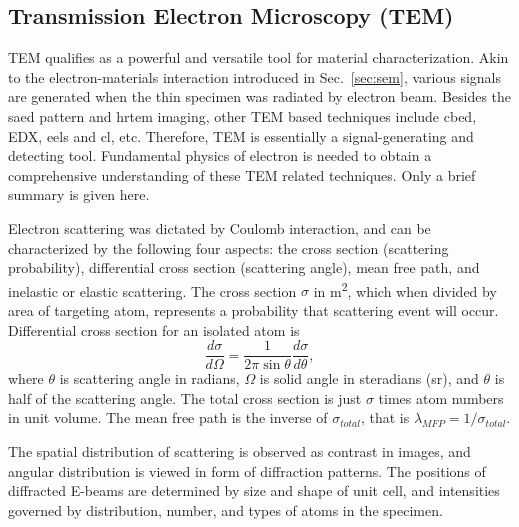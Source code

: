 \subsection{Transmission Electron Microscopy (TEM)}

TEM qualifies as a powerful and versatile tool for material characterization. Akin to the electron-materials interaction introduced in Sec.~\ref{sec:sem}, various signals are generated when the thin specimen was radiated by electron beam. Besides the \gls{saed} pattern and \gls{hrtem} imaging, other TEM based techniques include \gls{cbed}, EDX, \gls{eels} and \gls{cl}, etc. Therefore, TEM is essentially a signal-generating and detecting tool. Fundamental physics of electron is needed to obtain a comprehensive understanding of these TEM related techniques. Only a brief summary is given here.

Electron scattering was dictated by Coulomb interaction, and can be characterized by the following four aspects: the cross section (scattering probability), differential cross section (scattering angle), mean free path, and inelastic or elastic scattering. The cross section $\sigma$ in \si{m^2}, which when divided by area of targeting atom, represents a probability that scattering event will occur. Differential cross section for an isolated atom is 
\[
\frac{d\sigma}{d\Omega} = \frac{1}{2\pi \sin\theta} \frac{d\sigma}{d\theta},
\] 
where $\theta$ is scattering angle in radians, $\Omega$ is solid angle in steradians (sr), and $\theta$ is half of the scattering angle. The total cross section is just $\sigma$ times atom numbers in unit volume. The mean free path is the inverse of $\sigma_{total}$, that is $\lambda_{MFP} = 1/\sigma_{total}$. 

The spatial distribution of scattering is observed as contrast in images, and angular distribution is viewed in form of diffraction patterns. The positions of diffracted E-beams are determined by size and shape of unit cell, and intensities governed by distribution, number, and types of atoms in the specimen. 

